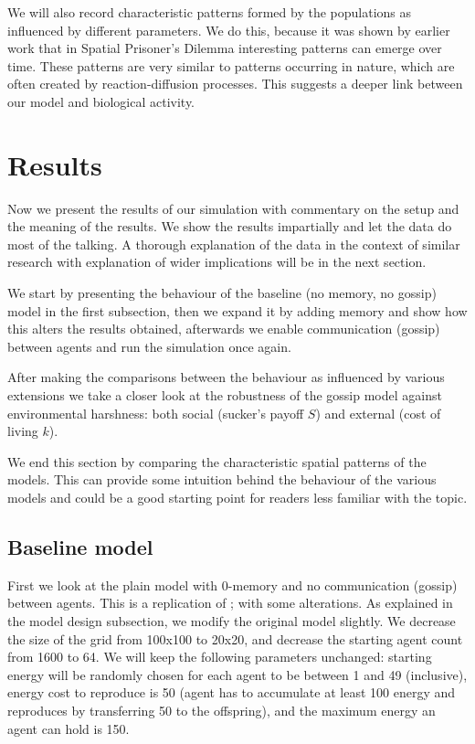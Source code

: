 \documentclass[english]{article}
\begin{document}
We will also record characteristic patterns formed by the populations as influenced by different parameters.
We do this, because it was shown by earlier work \citep{spatial-patterns} that in Spatial Prisoner's Dilemma interesting patterns can emerge over time.
These patterns are very similar to patterns occurring in nature, which are often created by reaction-diffusion processes.
This suggests a deeper link between our model and biological activity.



\section{Results}
Now we present the results of our simulation
with commentary on the setup and the meaning of the results.
We show the results impartially and let the data do most of the talking.
A thorough explanation of the data in the context of similar research
with explanation of wider implications will be in the next section.

We start by presenting the behaviour of the baseline (no memory, no gossip) model in the first subsection,
then we expand it by adding memory and show how this alters the results obtained,
afterwards we enable communication (gossip) between agents and run the simulation once again.

After making the comparisons between the behaviour as influenced by various extensions we take a closer look at the robustness of the gossip model against environmental harshness: both social (sucker's payoff $S$) and external (cost of living $k$).

We end this section by comparing the characteristic spatial patterns of the models.
This can provide some intuition behind the behaviour of the various models and
could be a good starting point for readers less familiar with the topic.


\subsection{Baseline model}
First we look at the plain model with 0-memory and no communication (gossip) between agents.
This is a replication of \citet{smaldino}; with some alterations.
As explained in the model design subsection, we modify the original model slightly.
We decrease the size of the grid from 100x100 to 20x20,
and decrease the starting agent count from 1600 to 64.
We will keep the following parameters unchanged:
starting energy will be randomly chosen for each agent to be between 1 and 49 (inclusive),
energy cost to reproduce is 50 (agent has to accumulate at least 100 energy and reproduces by transferring 50 to the offspring),
and the maximum energy an agent can hold is 150.
\end{document}

